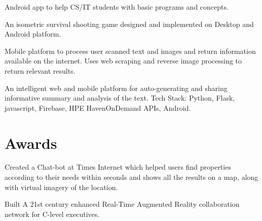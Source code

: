 \documentclass[a4paper]{deedy-resume} %
\begin{document}
\begin{minipage}[t]{0.66\textwidth}

Android app to help CS/IT students with basic programs and concepts.
\sectionspace %


An isometric survival shooting game designed and implemented on Desktop and Android platform.

\sectionspace %



Mobile platform to process user scanned text and images and return information available on the internet. Uses web scraping and reverse image processing to return relevant results.

\sectionspace %



An intelligent web and mobile platform for auto-generating and sharing informative summary and analysis of the text. Tech Stack: Python, Flask, javascript, Firebase, HPE HavenOnDemand APIs, Android.

\sectionspace %


\section{Awards}


Created a Chat-bot at Times Internet which helped users find properties according to their needs within seconds and shows all the results on a map, along with virtual imagery of the location.

\sectionspace %



Built A 21st century enhanced Real-Time Augmented Reality collaboration network for C-level executives.


\end{minipage}
\end{document}
